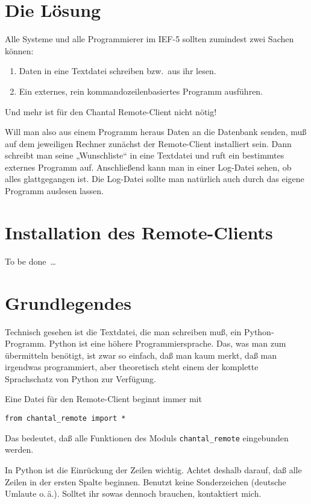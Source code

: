\documentclass[german,11pt]{article}
\newcommand{\IEF}{\mbox{IEF-5}\xspace}
\begin{document}
\section{Die Lösung}

Alle Systeme und alle Programmierer im \IEF sollten zumindest zwei Sachen
können:
\begin{enumerate}
\item Daten in eine Textdatei schreiben bzw.\ aus ihr lesen.
\item Ein externes, rein kommandozeilenbasiertes Programm ausführen.
\end{enumerate}
Und mehr ist für den Chantal Remote-Client nicht nötig!

Will man also aus einem Programm heraus Daten an die Datenbank senden, muß auf
dem jeweiligen Rechner zunächst der Remote-Client installiert sein.  Dann
schreibt man seine „Wunschliste“ in eine Textdatei und ruft ein bestimmtes
externes Programm auf.  Anschließend kann man in einer Log-Datei sehen, ob
alles glattgegangen ist.  Die Log-Datei sollte man natürlich auch durch das
eigene Programm auslesen lassen.

\section{Installation des Remote-Clients}

To be done~…

\section{Grundlegendes}

Technisch gesehen ist die Textdatei, die man schreiben muß, ein
Python-Programm.  Python ist eine höhere Programmiersprache.  Das, was man zum
übermitteln benötigt, ist zwar so einfach, daß man kaum merkt, daß man
irgendwas programmiert, aber theoretisch steht einem der komplette Sprachschatz
von Python zur Verfügung.

Eine Datei für den Remote-Client beginnt immer mit
\begin{lstlisting}
from chantal_remote import *
\end{lstlisting}
Das bedeutet, daß alle Funktionen des Moduls \lstinline{chantal_remote}
eingebunden werden.

In Python ist die Einrückung der Zeilen wichtig.  Achtet deshalb darauf, daß
alle Zeilen in der ersten Spalte beginnen.  Benutzt keine Sonderzeichen
(deutsche Umlaute o.\,ä.).  Solltet ihr sowas dennoch brauchen, kontaktiert
mich.
\end{document}
